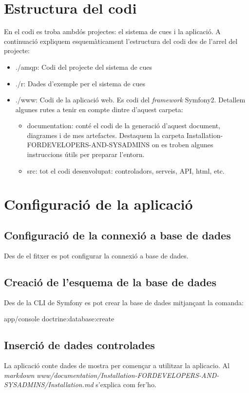 \section{Estructura del codi}
En el codi es troba ambdós projectes: el sistema de cues i la aplicació. A continuació expliquem esquemàticament l'estructura del codi des de l'arrel del projecte:
\begin{itemize}
\item ./amqp: Codi del projecte del sistema de cues
\item ./r: Dades d'exemple per el sistema de cues
\item ./www: Codi de la aplicació web. Es codi del \textit{framework} Symfony2. Detallem algunes rutes a tenir en compte dintre d'aquest carpeta:
\begin{itemize}
\item documentation: cont\'{e} el codi de la generació d'aquest document, diagrames i de mes artefactes. Destaquem la carpeta Installation-FORDEVELOPERS-AND-SYSADMINS on es troben algunes instruccions útils per preparar l'entorn.
\item src: tot el codi desenvolupat: controladors, serveis, API, html, etc.
\end{itemize}
\end{itemize}

\section{Configuració de la aplicació}
\subsection{Configuració de la connexió a base de dades}
Des de el fitxer  es pot configurar la connexió a base de dades.

\subsection{Creació de l'esquema de la base de dades}
Des de la CLI de Symfony es pot crear la base de dades mitjançant la comanda:
\begin{center}
app/console doctrine:database:create
\end{center}

\subsection{Inserció de dades controlades}
La aplicació conte dades de mostra per començar a utilitzar la aplicacio. Al \textit{markdown} \textit{www/documentation/Installation-FORDEVELOPERS-AND-SYSADMINS/Installation.md} s'explica com fer'ho.

